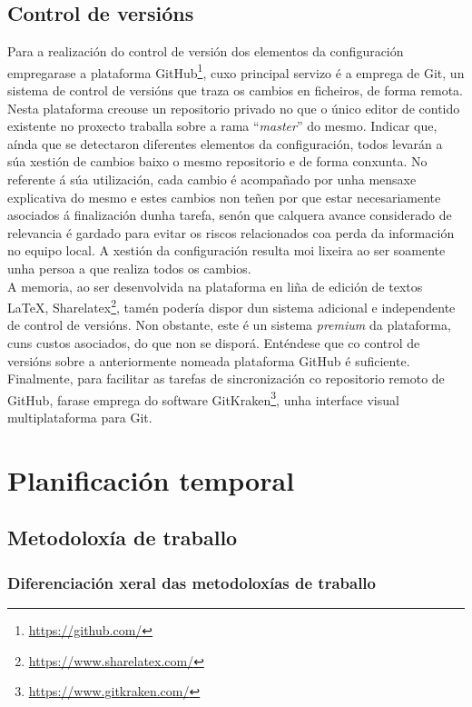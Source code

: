 \subsection{Control de versións}

Para a realización do control de versión dos elementos da configuración empregarase a plataforma GitHub\footnote{\url{https://github.com/}}, cuxo principal servizo é a emprega de Git, un sistema de control de versións que traza os cambios en ficheiros, de forma remota. Nesta plataforma creouse un repositorio privado no que o único editor de contido existente no proxecto traballa sobre a rama ``\textit{master}'' do mesmo. Indicar que, aínda que se detectaron diferentes elementos da configuración, todos levarán a súa xestión de cambios baixo o mesmo repositorio e de forma conxunta. No referente á súa utilización, cada cambio é acompañado por unha mensaxe explicativa do mesmo e estes cambios non teñen por que estar necesariamente asociados á finalización dunha tarefa, senón que calquera avance considerado de relevancia é gardado para evitar os riscos relacionados coa perda da información no equipo local. A xestión da configuración resulta moi lixeira ao ser soamente unha persoa a que realiza todos os cambios.\\

A memoria, ao ser desenvolvida na plataforma en liña de edición de textos \LaTeX, Sharelatex\footnote{\url{https://www.sharelatex.com/}}, tamén podería dispor dun sistema adicional e independente de control de versións. Non obstante, este é un sistema \textit{premium} da plataforma, cuns custos asociados, do que non se disporá. Enténdese que co control de versións sobre a anteriormente nomeada plataforma GitHub é suficiente.\\

Finalmente, para facilitar as tarefas de sincronización co repositorio remoto de GitHub, farase emprega do software GitKraken\footnote{\url{https://www.gitkraken.com/}}, unha interface visual multiplataforma para Git.

\section{Planificación temporal}

\subsection{Metodoloxía de traballo}

\subsubsection{Diferenciación xeral das metodoloxías de traballo}

